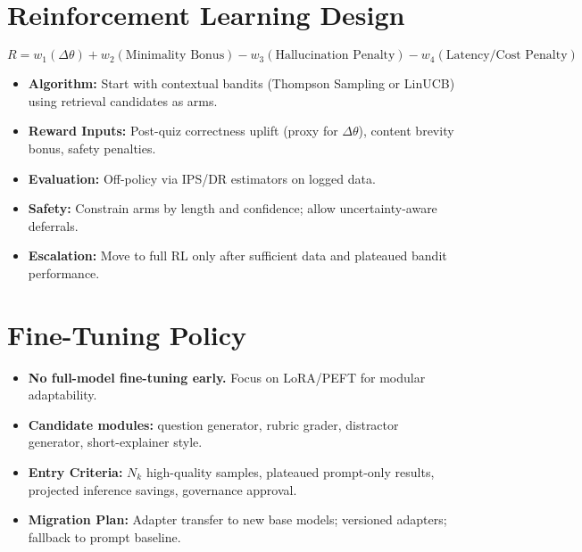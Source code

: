 \documentclass[12pt]{article}
\begin{document}
\section{Reinforcement Learning Design}

\[
R = w_1(\Delta \theta) + w_2(\text{Minimality Bonus}) 
    - w_3(\text{Hallucination Penalty}) 
    - w_4(\text{Latency/Cost Penalty})
\]

\begin{itemize}[leftmargin=1.2cm]
  \item \textbf{Algorithm:} Start with contextual bandits (Thompson Sampling or LinUCB) using retrieval candidates as arms.
  \item \textbf{Reward Inputs:} Post-quiz correctness uplift (proxy for $\Delta \theta$), content brevity bonus, safety penalties.
  \item \textbf{Evaluation:} Off-policy via IPS/DR estimators on logged data.
  \item \textbf{Safety:} Constrain arms by length and confidence; allow uncertainty-aware deferrals.
  \item \textbf{Escalation:} Move to full RL only after sufficient data and plateaued bandit performance.
\end{itemize}

\section{Fine-Tuning Policy}
\begin{itemize}[leftmargin=1.2cm]
  \item \textbf{No full-model fine-tuning early.} Focus on LoRA/PEFT for modular adaptability.
  \item \textbf{Candidate modules:} question generator, rubric grader, distractor generator, short-explainer style.
  \item \textbf{Entry Criteria:} $N_k$ high-quality samples, plateaued prompt-only results, projected inference savings, governance approval.
  \item \textbf{Migration Plan:} Adapter transfer to new base models; versioned adapters; fallback to prompt baseline.
\end{itemize}
\end{document}
